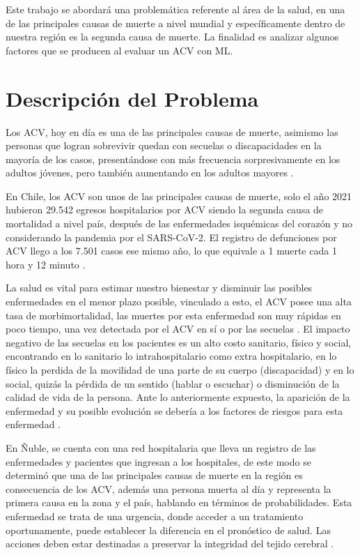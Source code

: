 \par Este trabajo se abordará una problemática referente al área de la salud, en una de las principales causas de muerte a nivel mundial y específicamente dentro de nuestra región es la segunda causa de muerte. La finalidad es analizar algunos factores que se producen al evaluar un ACV con ML.\\


\doublespacing
\section{Descripción del Problema}
Los ACV, hoy en día es una de las principales causas de muerte, asimismo las personas que logran sobrevivir quedan con secuelas o discapacidades en la mayoría de los casos, presentándose con más frecuencia sorpresivamente en los adultos jóvenes, pero también aumentando en los adultos mayores \cite{Ortiz-Galeano2020}. \\
\par En Chile, los ACV son unos de las principales causas de muerte, solo el año 2021 hubieron 29.542 egresos hospitalarios por ACV siendo la segunda causa de mortalidad a nivel país, después de las enfermedades isquémicas del corazón y no considerando la pandemia por el SARS-CoV-2. El registro de defunciones por ACV llego a los 7.501 casos ese mismo año, lo que equivale a 1 muerte cada 1 hora y 12 minuto \cite{Minsal2022}.\\
\par La salud es vital para estimar nuestro bienestar y disminuir las posibles enfermedades en el menor plazo posible, vinculado a esto, el ACV posee una alta tasa de morbimortalidad, las muertes por esta enfermedad son muy rápidas en poco tiempo, una vez detectada por el ACV en sí o por las secuelas \cite{Gaudiano2019}. El impacto negativo de las secuelas en los pacientes es un alto costo sanitario, físico y social, encontrando en lo sanitario lo intrahospitalario como extra hospitalario, en lo físico la perdida de la movilidad de una parte de su cuerpo (discapacidad) y en lo social, quizás la pérdida de un sentido (hablar o escuchar) o disminución de la calidad de vida de la persona. Ante lo anteriormente expuesto, la aparición de la enfermedad y su posible evolución se debería a los factores de riesgos para esta enfermedad \cite{Cabrera2020}.\\
\par En Ñuble, se cuenta con una red hospitalaria que lleva un registro de las enfermedades y pacientes que ingresan a los hospitales, de este modo se determinó que una de las principales causas de muerte en la región es consecuencia de los ACV, además una persona muerta al día y representa la primera causa en la zona y el país, hablando en términos de probabilidades. Esta enfermedad se trata de una urgencia, donde acceder a un tratamiento oportunamente, puede establecer la diferencia en el pronóstico de salud. Las acciones deben estar destinadas a preservar la integridad del tejido cerebral \cite{ServicioSaludNuble}.\\
